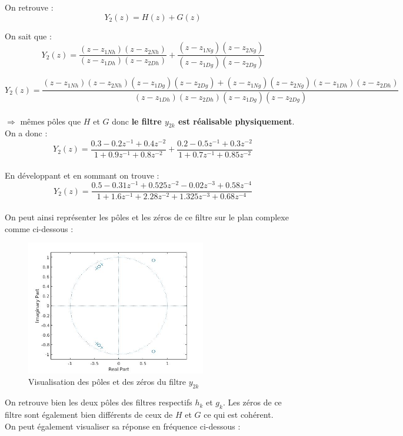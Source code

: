 \documentclass[12,french]{report}
\begin{document}
On retrouve :
$$ Y_2(z)=H(z)+G(z)$$

On sait que :
$$ Y_2(z)= \frac{(z-z_{1Nh})(z-z_{2Nh})}{(z-z_{1Dh})(z-z_{2Dh})}+\frac{(z-z_{1Ng})(z-z_{2Ng})}{(z-z_{1Dg})(z-z_{2Dg})} $$

$$ Y_2(z)= \frac{(z-z_{1Nh})(z-z_{2Nh})(z-z_{1Dg})(z-z_{2Dg})+(z-z_{1Ng})(z-z_{2Ng})(z-z_{1Dh})(z-z_{2Dh})}{(z-z_{1Dh})(z-z_{2Dh})(z-z_{1Dg})(z-z_{2Dg})} $$\\
$\Longrightarrow$ mêmes pôles que $H$ et $G$ donc \textbf{le filtre $y_{2k}$ est réalisable physiquement}.\\


On a donc :\\
$$Y_2(z)=\frac{0.3-0.2z^{-1}+0.4z^{-2}}{1+0.9z^{-1}+0.8z^{-2}}+\frac{0.2-0.5z^{-1}+0.3z^{-2}}{1+0.7z^{-1}+0.85z^{-2}} $$\\

En développant et en sommant on trouve :
$$Y_2(z)=\frac{0.5-0.31z^{-1}+0.525z^{-2}-0.02z^{-3}+0.58z^{-4}}{1+1.6z^{-1}+2.28z^{-2}+1.325z^{-3}+0.68z^{-4}} $$\\

On peut ainsi représenter les pôles et les zéros de ce filtre sur le plan complexe comme ci-dessous :

\begin{figure}[H]
	\center
	\includegraphics[width=0.7\textwidth]{./Images/zplane_Y2}
	\caption{Visualisation des pôles et des zéros du filtre $y_{2k}$}
\end{figure}\vspace{0.2cm}

On retrouve bien les deux pôles des filtres respectifs $h_k$ et $g_k$. Les zéros de ce filtre sont également bien différents de ceux de $H$ et $G$ ce qui est cohérent.\\

On peut également visualiser sa réponse en fréquence ci-dessous :
\end{document}
